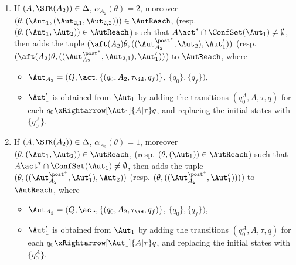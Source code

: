 {\begin{minipage}{0.95\textwidth}
\begin{enumerate}
\begin{itemize}
            \item $\Aut_1'$ (resp. $\Aut_{1,1}'$) is obtained from $\Aut_1$ (resp. $\Aut_{1,1}$) by 
                adding the transitions $(q_0^{A},A,\tau,q)$ for each $q_0\xRightarrow[\Aut_1]{A | \tau} q$ (resp. $q_0\xRightarrow[\Aut_{1,1}]{A | \tau} q$), and replacing the initial states with $\{q_0^{A}\}$.
        \end{itemize}
    \item If $(A,\STK(A_2)) \in\Delta$, $\alpha_{A_2}(\theta) = 2$, moreover $(\theta, (\Aut_1,(\Aut_{2,1},\Aut_{2,2}))) \in \AutReach$, (resp. $(\theta, (\Aut_1,\Aut_2)) \in \AutReach$) such that $A\act^*\cap\ConfSet(\Aut_1)\neq \emptyset$, then adds the tuple $(\aft(A_2)\theta, ((\Aut_{A_2}^{\post^*},\Aut_2),\Aut_1'))$ (resp. $(\aft(A_2)\theta, ((\Aut_{A_2}^{\post^*},\Aut_{2,1}),\Aut_1'))$) to $\AutReach$, 
        where 
        \begin{itemize}
            \item $\Aut_{A_2} = (Q, \act, \{(q_0, A_2, \tau_{\id}, q_f)\}$, $\{q_0\},\{q_f\})$,
            \item $\Aut_1'$ is obtained from $\Aut_1$ by adding the transitions $(q_0^{A},A,\tau,q)$ for each $q_0\xRightarrow[\Aut_1]{A | \tau} q$, and replacing the initial states with $\{q_0^{A}\}$.
        \end{itemize}
    \item If $(A,\STK(A_2)) \in\Delta$, $\alpha_{A_2}(\theta) = 1$, moreover $(\theta, (\Aut_1,\Aut_2)) \in \AutReach$, (resp. $(\theta, (\Aut_1)) \in \AutReach$) such that $A\act^*\cap\ConfSet(\Aut_1)\neq \emptyset$, then adds the tuple $(\theta, ((\Aut_{A_2}^{\post^*},\Aut_1'),\Aut_2))$ (resp. $(\theta, ((\Aut_{A_2}^{\post^*},\Aut_1')))$) to $\AutReach$, 
        where 
        \begin{itemize}
            \item $\Aut_{A_2} = (Q, \act, \{(q_0, A_2, \tau_{\id}, q_f)\}$, $\{q_0\},\{q_f\})$,
            \item $\Aut_1'$ is obtained from $\Aut_1$ by adding the transitions $(q_0^{A},A,\tau,q)$ for each $q_0\xRightarrow[\Aut_1]{A | \tau} q$, and replacing the initial states with $\{q_0^{A}\}$.

\end{itemize}
\end{enumerate}
\end{minipage}}
